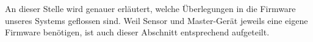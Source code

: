 An  dieser  Stelle wird  genauer  erl\"autert,  welche \"Uberlegungen  in  die
Firmware  unseres  Systems  geflossen  sind. Weil  Sensor  und  Master-Ger\"at
jeweils  eine   eigene  Firmware   ben\"otigen,  ist  auch   dieser  Abschnitt
entsprechend aufgeteilt.
